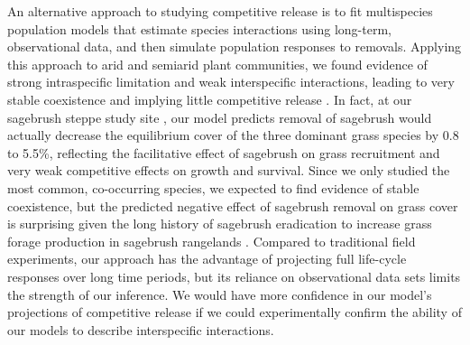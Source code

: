 \documentclass[11pt]{article}
\begin{document}
\begin{doublespacing}
An alternative approach to studying competitive release is to fit multispecies population models that estimate species interactions using long-term, observational data, and then simulate population responses to removals. Applying this approach to arid and semiarid plant communities, we found evidence of strong intraspecific limitation and weak interspecific interactions, leading to very stable coexistence and implying little competitive release \citep{adler_coexistence_2010,chu_large_2015}. In fact, at our sagebrush steppe study site  \citep{adler_coexistence_2010}, our model predicts removal of sagebrush would actually decrease the equilibrium cover of the three dominant grass species by 0.8 to 5.5\%, reflecting the facilitative effect of sagebrush on grass recruitment and very weak competitive effects on growth and survival.  Since we only studied the most common, co-occurring species, we expected to find evidence of stable coexistence, but the predicted negative effect of sagebrush removal on grass cover is surprising given the long history of sagebrush eradication to increase grass forage production in sagebrush rangelands \citep{Cook1963, Mueggler1958, Robertson1947}. Compared to traditional field experiments, our approach has the advantage of projecting full life-cycle responses over long time periods, but its reliance on observational data sets limits the strength of our inference. We would have more confidence in our model's projections of competitive release if we could experimentally confirm the ability of our models to describe interspecific interactions.


\end{doublespacing}
\end{document}
